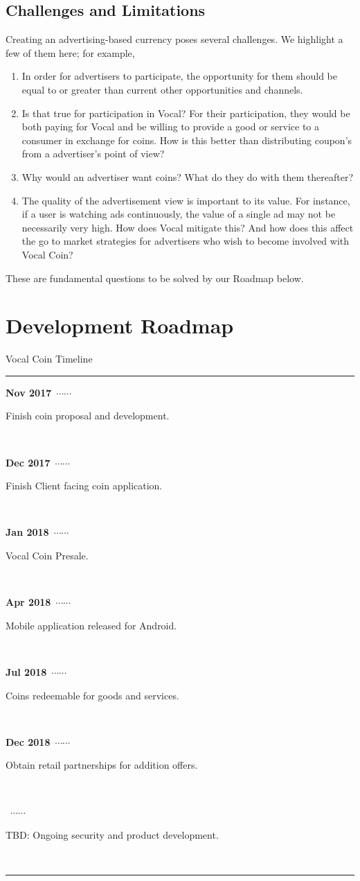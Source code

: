 \documentclass[conference]{IEEEtran}
\begin{document}
    \subsection{Challenges and Limitations}

    Creating an advertising-based currency poses several challenges. We highlight a few of them here; for example,

    \begin{enumerate}
      \item In order for advertisers to participate, the opportunity for them should be equal to or greater than current other opportunities and channels. 
      \item Is that true for participation in Vocal? For their participation, they would be both paying for Vocal and be willing to provide a good or service to a consumer in exchange for coins. How is this better than distributing coupon’s from a advertiser’s point of view?
      \item Why would an advertiser want coins? What do they do with them thereafter?
      \item The quality of the advertisement view is important to its value. For instance, if a user is watching ads continuously, the value of a single ad may not be necessarily very high. How does Vocal mitigate this? And how does this affect the go to market strategies for advertisers who wish to become involved with Vocal Coin?
    \end{enumerate}

    These are fundamental questions to be solved by our Roadmap below.
    
    \section{Development Roadmap}


    \newcommand\ytl[2]{
    \parbox[b]{8em}{\hfill{\color{cyan}\bfseries\sffamily #1}~$\cdots\cdots$~}\makebox[0pt][c]{$\bullet$}\vrule\quad \parbox[c]{3cm}{\vspace{7pt}\color{red!40!black!80}\raggedright\sffamily #2.\\[7pt]}\\[-3pt]}
    \begin{table}
    \caption{Vocal Coin Timeline}
    \centering
    \begin{minipage}[t]{\linewidth}
    \color{gray}
    \rule{\linewidth}{1pt}
    \ytl{Nov 2017}{Finish coin proposal and development}
    \ytl{Dec 2017}{Finish Client facing coin application}
    \ytl{Jan 2018}{Vocal Coin Presale}
    \ytl{Apr 2018}{Mobile application released for Android}
    \ytl{Jul 2018}{Coins redeemable for goods and services}
    \ytl{Dec 2018}{Obtain retail partnerships for addition offers}
    \ytl{2019}{TBD: Ongoing security and product development}
    \bigskip
    \rule{\linewidth}{1pt}%
    \end{minipage}%
    \end{table}
\end{document}

